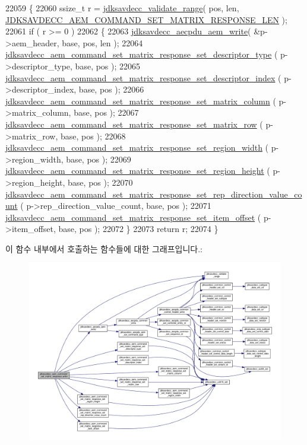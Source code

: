 \begin{DoxyCode}
22059 \{
22060     ssize\_t r = \hyperlink{group__util_ga9c02bdfe76c69163647c3196db7a73a1}{jdksavdecc\_validate\_range}( pos, len, 
      \hyperlink{group__command__set__matrix__response_ga2e35d80d27f6e6764556c6a0f3486f78}{JDKSAVDECC\_AEM\_COMMAND\_SET\_MATRIX\_RESPONSE\_LEN} );
22061     \textcolor{keywordflow}{if} ( r >= 0 )
22062     \{
22063         \hyperlink{group__aecpdu__aem_gad658e55771cce77cecf7aae91e1dcbc5}{jdksavdecc\_aecpdu\_aem\_write}( &p->aem\_header, base, pos, len );
22064         \hyperlink{group__command__set__matrix__response_gafe02acad4e7919ab5beba6468cbe12d9}{jdksavdecc\_aem\_command\_set\_matrix\_response\_set\_descriptor\_type}
      ( p->descriptor\_type, base, pos );
22065         \hyperlink{group__command__set__matrix__response_ga312457f9e3f65242ca3fbc242e894e05}{jdksavdecc\_aem\_command\_set\_matrix\_response\_set\_descriptor\_index}
      ( p->descriptor\_index, base, pos );
22066         \hyperlink{group__command__set__matrix__response_ga16f2df6027e6d88a6a8874ff919d209f}{jdksavdecc\_aem\_command\_set\_matrix\_response\_set\_matrix\_column}
      ( p->matrix\_column, base, pos );
22067         \hyperlink{group__command__set__matrix__response_ga431661c873bea7f896d8bfb24f6b2baa}{jdksavdecc\_aem\_command\_set\_matrix\_response\_set\_matrix\_row}
      ( p->matrix\_row, base, pos );
22068         \hyperlink{group__command__set__matrix__response_ga98e4b92c9ff485c8573791adfee646cb}{jdksavdecc\_aem\_command\_set\_matrix\_response\_set\_region\_width}
      ( p->region\_width, base, pos );
22069         \hyperlink{group__command__set__matrix__response_ga798bcf71e29d3e5df2348dfb52202769}{jdksavdecc\_aem\_command\_set\_matrix\_response\_set\_region\_height}
      ( p->region\_height, base, pos );
22070         \hyperlink{group__command__set__matrix__response_ga6f8ed8f618be7698e37e92f2796fdac6}{jdksavdecc\_aem\_command\_set\_matrix\_response\_set\_rep\_direction\_value\_count}
      ( p->rep\_direction\_value\_count, base, pos );
22071         \hyperlink{group__command__set__matrix__response_gace6e5551c76a893e681188c5dcd9fbb2}{jdksavdecc\_aem\_command\_set\_matrix\_response\_set\_item\_offset}
      ( p->item\_offset, base, pos );
22072     \}
22073     \textcolor{keywordflow}{return} r;
22074 \}
\end{DoxyCode}


이 함수 내부에서 호출하는 함수들에 대한 그래프입니다.\+:
\nopagebreak
\begin{figure}[H]
\begin{center}
\leavevmode
\includegraphics[width=350pt]{group__command__set__matrix__response_ga8389d09bf683989b1447cbd0d3f00179_cgraph}
\end{center}
\end{figure}



